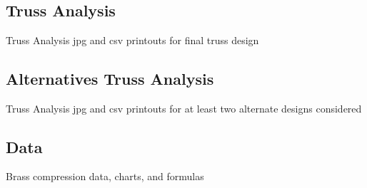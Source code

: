 \documentclass{article}
\let\Oldsubsection\subsection
\renewcommand{\subsection}{\FloatBarrier\Oldsubsection}
\begin{document}
\begin{figure}
\begin{ganttchart}{1}{12}
\\
\\
 \\
 \\
 \\
\\
\end{ganttchart}
\end{figure}

\newpage

\subsection{Truss Analysis}

Truss Analysis jpg and csv printouts for final truss design

\newpage

\subsection{Alternatives Truss Analysis}

Truss Analysis jpg and csv printouts for at least two alternate designs considered

\newpage

\subsection{Data}

Brass compression data, charts, and formulas

\newpage

\printbibliography
\end{document}
